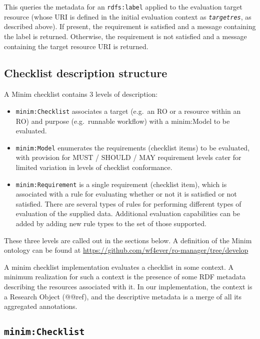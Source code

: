 \documentclass[]{article}
\begin{document}
This queries the metadata for an \texttt{rdfs:label} applied to the
evaluation target resource (whose URI is defined in the initial
evaluation context as \emph{\texttt{targetres}}, as described above). If
present, the requirement is satisfied and a message containing the label
is returned. Otherwise, the requirement is not satisfied and a message
containing the target resource URI is returned.

\subsection{Checklist description structure}

A Minim checklist contains 3 levels of description:

\begin{itemize}
\itemsep1pt\parskip0pt
\item
  \texttt{minim:Checklist} associates a target (e.g.~an RO or a resource
  within an RO) and purpose (e.g.~runnable workflow) with a minim:Model
  to be evaluated.
\item
  \texttt{minim:Model} enumerates the requirements (checklist items) to
  be evaluated, with provision for MUST / SHOULD / MAY requirement
  levels cater for limited variation in levels of checklist conformance.
\item
  \texttt{minim:Requirement} is a single requirement (checklist item),
  which is associated with a rule for evaluating whether or not it is
  satisfied or not satisfied. There are several types of rules for
  performing different types of evaluation of the supplied data.
  Additional evaluation capabilities can be added by adding new rule
  types to the set of those supported.
\end{itemize}

These three levels are called out in the sections below. A definition of
the Minim ontology can be found at
\href{}{https://github.com/wf4ever/ro-manager/tree/develop}

A minim checklist implementation evaluates a checklist in some context.
A minimum realization for such a context is the presence of some RDF
metadata describing the resources associated with it. In our
implementation, the context is a Research Object (@@ref), and the
descriptive metadata is a merge of all its aggregated annotations.

\subsection{\texttt{minim:Checklist}}
\end{document}
